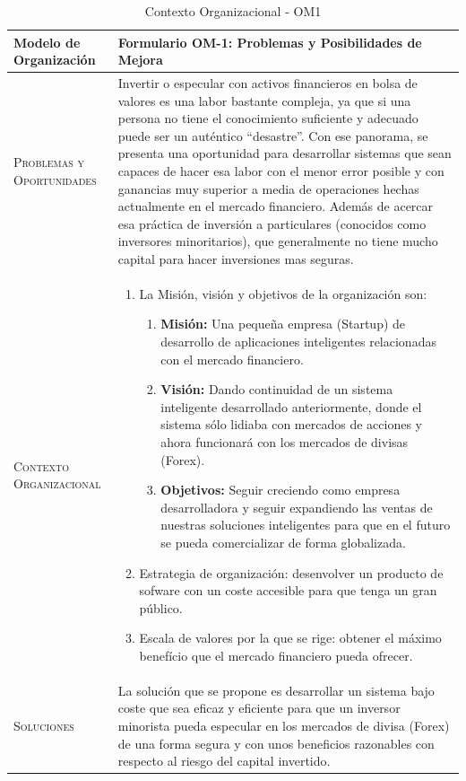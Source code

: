 \begin{table}[H]
\scriptsize
\begin{tabularx}{\textwidth}{|l|X|} \hline
\textbf{Modelo de Organización} & \textbf{Formulario OM-1: Problemas y Posibilidades de Mejora} \\ \hline\hline

\textsc{Problemas y Oportunidades} & Invertir o especular con activos financieros en bolsa de valores es una labor bastante compleja, ya que si una persona no tiene el conocimiento suficiente y adecuado puede ser un auténtico ``desastre''. Con ese panorama, se presenta una oportunidad para desarrollar sistemas que sean capaces de hacer esa labor con el menor error posible y con ganancias muy superior a media de operaciones hechas actualmente en el mercado financiero. Además de acercar esa práctica de inversión a particulares (conocidos como inversores minoritarios), que generalmente no tiene mucho capital para hacer inversiones mas seguras.\\ \hline
\textsc{Contexto Organizacional} & 
\begin{enumerate}
  \item La Misión, visión y objetivos de la organización son:  
  \begin{enumerate}
    \item \textbf{Misión:} Una pequeña empresa (Startup) de desarrollo de aplicaciones inteligentes relacionadas con el mercado financiero.
    \item \textbf{Visión:} Dando continuidad de un sistema inteligente desarrollado anteriormente, donde el sistema sólo lidiaba con mercados de acciones y ahora funcionará con los mercados de divisas (Forex).
    \item \textbf{Objetivos:} Seguir creciendo como empresa desarrolladora y seguir expandiendo las ventas de nuestras soluciones inteligentes para que en el futuro se pueda comercializar de forma globalizada.
  \end{enumerate}
  \item Estrategia de organización: desenvolver un producto de sofware con un coste accesible para que tenga un gran público.
  \item Escala de valores por la que se rige: obtener el máximo benefício que el mercado financiero pueda ofrecer.
\end{enumerate}    \\ \hline
\textsc{Soluciones} & La solución que se propone es desarrollar un sistema bajo coste que sea eficaz y eficiente para que un inversor minorista pueda especular en los mercados de divisa (Forex) de una forma segura y con unos beneficios razonables con respecto al riesgo del capital invertido. \\
\hline
\end{tabularx}
  \caption{\label{tab:OM1}Contexto Organizacional - OM1}
\end{table}
	
